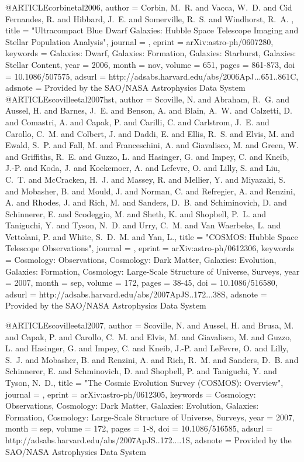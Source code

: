 {{{{{{{{{{{{{{@ARTICLE{corbinetal2006,
   author = {{Corbin}, M.~R. and {Vacca}, W.~D. and {Cid Fernandes}, R. and 
	{Hibbard}, J.~E. and {Somerville}, R.~S. and {Windhorst}, R.~A.
	},
    title = "{Ultracompact Blue Dwarf Galaxies: Hubble Space Telescope Imaging and Stellar Population Analysis}",
  journal = {\apj},
   eprint = {arXiv:astro-ph/0607280},
 keywords = {Galaxies: Dwarf, Galaxies: Formation, Galaxies: Starburst, Galaxies: Stellar Content},
     year = 2006,
    month = nov,
   volume = 651,
    pages = {861-873},
      doi = {10.1086/507575},
   adsurl = {http://adsabs.harvard.edu/abs/2006ApJ...651..861C},
  adsnote = {Provided by the SAO/NASA Astrophysics Data System}
}
@ARTICLE{scovilleetal2007hst,
   author = {{Scoville}, N. and {Abraham}, R.~G. and {Aussel}, H. and {Barnes}, J.~E. and 
	{Benson}, A. and {Blain}, A.~W. and {Calzetti}, D. and {Comastri}, A. and 
	{Capak}, P. and {Carilli}, C. and {Carlstrom}, J.~E. and {Carollo}, C.~M. and 
	{Colbert}, J. and {Daddi}, E. and {Ellis}, R.~S. and {Elvis}, M. and 
	{Ewald}, S.~P. and {Fall}, M. and {Franceschini}, A. and {Giavalisco}, M. and 
	{Green}, W. and {Griffiths}, R.~E. and {Guzzo}, L. and {Hasinger}, G. and 
	{Impey}, C. and {Kneib}, J.-P. and {Koda}, J. and {Koekemoer}, A. and 
	{Lefevre}, O. and {Lilly}, S. and {Liu}, C.~T. and {McCracken}, H.~J. and 
	{Massey}, R. and {Mellier}, Y. and {Miyazaki}, S. and {Mobasher}, B. and 
	{Mould}, J. and {Norman}, C. and {Refregier}, A. and {Renzini}, A. and 
	{Rhodes}, J. and {Rich}, M. and {Sanders}, D.~B. and {Schiminovich}, D. and 
	{Schinnerer}, E. and {Scodeggio}, M. and {Sheth}, K. and {Shopbell}, P.~L. and 
	{Taniguchi}, Y. and {Tyson}, N.~D. and {Urry}, C.~M. and {Van Waerbeke}, L. and 
	{Vettolani}, P. and {White}, S.~D.~M. and {Yan}, L.},
    title = "{COSMOS: Hubble Space Telescope Observations}",
  journal = {\apjs},
   eprint = {arXiv:astro-ph/0612306},
 keywords = {Cosmology: Observations, Cosmology: Dark Matter, Galaxies: Evolution, Galaxies: Formation, Cosmology: Large-Scale Structure of Universe, Surveys},
     year = 2007,
    month = sep,
   volume = 172,
    pages = {38-45},
      doi = {10.1086/516580},
   adsurl = {http://adsabs.harvard.edu/abs/2007ApJS..172...38S},
  adsnote = {Provided by the SAO/NASA Astrophysics Data System}
}


@ARTICLE{scovilleetal2007,
   author = {{Scoville}, N. and {Aussel}, H. and {Brusa}, M. and {Capak}, P. and 
	{Carollo}, C.~M. and {Elvis}, M. and {Giavalisco}, M. and {Guzzo}, L. and 
	{Hasinger}, G. and {Impey}, C. and {Kneib}, J.-P. and {LeFevre}, O. and 
	{Lilly}, S.~J. and {Mobasher}, B. and {Renzini}, A. and {Rich}, R.~M. and 
	{Sanders}, D.~B. and {Schinnerer}, E. and {Schminovich}, D. and 
	{Shopbell}, P. and {Taniguchi}, Y. and {Tyson}, N.~D.},
    title = "{The Cosmic Evolution Survey (COSMOS): Overview}",
  journal = {\apjs},
   eprint = {arXiv:astro-ph/0612305},
 keywords = {Cosmology: Observations, Cosmology: Dark Matter, Galaxies: Evolution, Galaxies: Formation, Cosmology: Large-Scale Structure of Universe, Surveys},
     year = 2007,
    month = sep,
   volume = 172,
    pages = {1-8},
      doi = {10.1086/516585},
   adsurl = {http://adsabs.harvard.edu/abs/2007ApJS..172....1S},
  adsnote = {Provided by the SAO/NASA Astrophysics Data System}
}


}}}}}}}}}}}}}}
